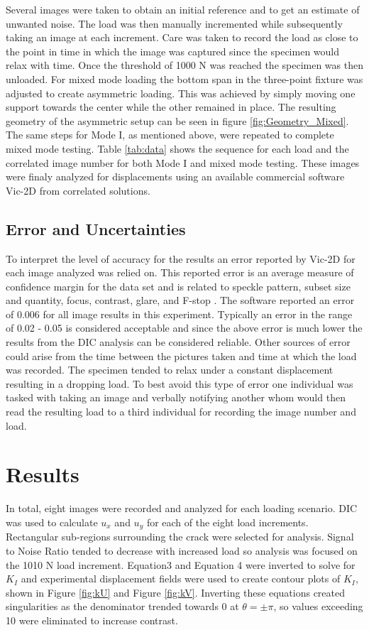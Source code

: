\documentclass[12pt]{article}
\begin{document}
Several images were taken to obtain an initial reference and to get an estimate of unwanted noise. The load was then manually incremented  while subsequently taking an image at each increment. Care was taken to record the load as close to the point in time in which  the image was captured since the specimen would relax with time. Once the threshold of 1000 N was reached  the specimen  was then unloaded.  For mixed mode loading the bottom span in the three-point fixture was adjusted to create asymmetric loading. This was achieved by simply moving one support towards the center while the other remained in place.  The resulting geometry of the asymmetric  setup can be seen in figure \ref{fig:Geometry_Mixed}. The same steps for Mode I, as mentioned above, were repeated to complete mixed mode testing. Table \ref{tab:data} shows the sequence for each load and the correlated image number for both Mode I and mixed mode testing. These images were finaly analyzed for displacements using an available commercial software Vic-2D from correlated solutions. 

 


\subsection{Error and Uncertainties} %
To interpret the  level of accuracy for the results an error reported by Vic-2D for each image analyzed was relied on. This reported error is an average measure of confidence margin for the data set \cite{Vic-2D} and is related to speckle pattern, subset size and quantity, focus, contrast, glare, and F-stop \cite{DIC_Err}. The software reported an error of 0.006 for all image results in this experiment. Typically an error in the range of 0.02 - 0.05 is  considered acceptable and since the above error is much lower the results from the DIC analysis can be considered reliable. Other sources of error could arise from the time between the pictures taken and time at which the load was recorded. The specimen tended to relax under a constant displacement resulting in a dropping load. To best avoid this type of error one individual was tasked with taking an image and verbally notifying another whom would then read the resulting load to a third individual for recording the image number and load.   

\section{Results}%
In total, eight images were recorded and analyzed for each loading scenario. DIC was used to calculate $u_x$ and $u_y$ for each of the eight load increments. Rectangular sub-regions surrounding the crack were selected for analysis. Signal to Noise Ratio tended to decrease with increased load so analysis was focused on the 1010 N load increment. Equation3 and Equation 4 were inverted to solve for $K_I$ and experimental displacement fields were used to create contour plots of $K_I$, shown in Figure \ref{fig:kU} and Figure \ref{fig:kV}. Inverting these equations created singularities as the denominator trended towards 0 at $\theta = \pm \pi$, so values exceeding 10 were eliminated to increase contrast. 
\end{document}
